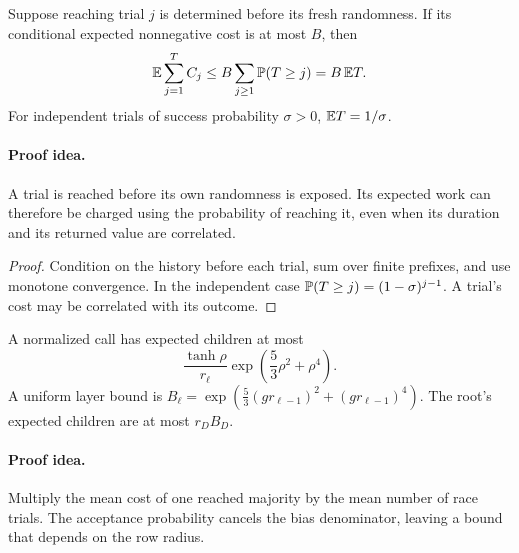 \begin{lemma}\label{lem:stopping}
Suppose reaching trial \(j\) is determined before its fresh
randomness. If its conditional expected nonnegative cost is at
most \(B\), then
\begin{equation}\label{eq:stoppedcost}
\mathbb E\sum_{j=1}^T C_j\le B\sum_{j\ge1}\mathbb P(T\ge j)=B\,\mathbb E T.
\end{equation}
For independent trials of success probability \(\sigma>0\),
\(\mathbb E T=1/\sigma\).
\end{lemma}
\paragraph{Proof idea.}
A trial is reached before its own randomness is exposed. Its expected work
can therefore be charged using the probability of reaching it, even when its
duration and its returned value are correlated.

\begin{proof}
Condition on the history before each trial, sum over finite
prefixes, and use monotone convergence. In the independent case
\(\mathbb P(T\ge j)=(1-\sigma)^{j-1}\).
A trial's cost may be correlated with its outcome.
\end{proof}

\begin{lemma}\label{lem:offspring}
A normalized call has expected children at most
\begin{equation}\label{eq:offspring}
\frac{\tanh\rho}{r_\ell}
\exp\!\left(\frac53\rho^2+\rho^4\right).
\end{equation}
A uniform layer bound is
\(B_\ell=\exp(\frac53(gr_{\ell-1})^2+(gr_{\ell-1})^4)\).
The root's expected children are at most \(r_DB_D\).
\end{lemma}
\paragraph{Proof idea.}
Multiply the mean cost of one reached majority by the mean number of race
trials. The acceptance probability cancels the bias denominator, leaving a
bound that depends on the row radius.

